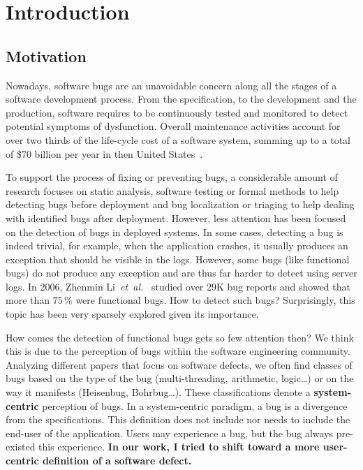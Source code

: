 \chapter{Introduction}
\label{ch:intro:introduction}

\section{Motivation}
Nowadays, software bugs are an unavoidable concern along all the stages of a software development process.
From the specification, to the development and the production, software requires to be continuously tested and monitored to detect potential symptoms of dysfunction.
Overall maintenance activities account for over two thirds of the life-cycle cost of a software system, summing up to a total of \$70 billion per year in then United States~\cite{planning2002economic}.

To support the process of fixing or preventing bugs, a considerable amount of research focuses on static analysis, software testing or formal methods to help detecting bugs before deployment and bug localization or triaging to help dealing with identified bugs after deployment.
However, less attention has been focused on the detection of bugs in deployed systems. 
In some cases, detecting a bug is indeed trivial, for example, when the application crashes, it usually produces an exception that should be visible in the logs.
However, some bugs (like functional bugs) do not produce any exception and are thus far harder to detect using server logs.
In 2006, Zhenmin Li~\textit{et~al.}~\cite{li2006have} studied over 29K bug reports and showed that more than $75\,\%$ were functional bugs.
How to detect such bugs? Surprisingly, this topic has been very sparsely explored given its importance.

How comes the detection of functional bugs gets so few attention then?
We think this is due to the perception of bugs within the software engineering community.
Analyzing different papers that focus on software defects, we often find classes of bugs based on the type of the bug (multi-threading, arithmetic, logic\dots) or on the way it manifests (Heisenbug, Bohrbug\dots).
These classifications denote a \textbf{system-centric} perception of bugs.
In a system-centric paradigm, a bug is a divergence from the specifications.
This definition does not include nor needs to include the end-user of the application.
Users may experience a bug, but the bug always pre-existed this experience. 
\textbf{In our work, I tried to shift toward a more user-centric definition of a software defect.}

